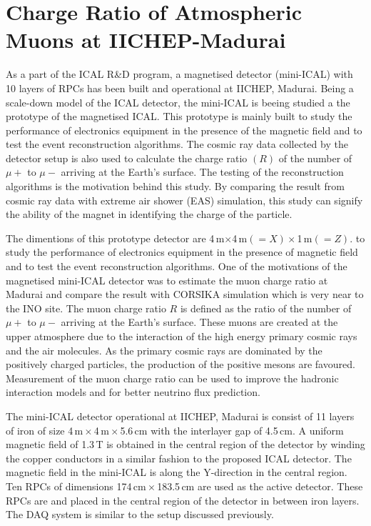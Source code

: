 
\chapter{Charge Ratio of Atmospheric Muons at IICHEP-Madurai}

As a part of the ICAL R\&D program, a magnetised detector (mini-ICAL)
with 10 layers of RPCs has been built and operational at IICHEP,
Madurai. Being a scale-down model of the ICAL detector, the mini-ICAL
is beeing studied a the prototype of the magnetised ICAL. This
prototype is mainly built to study the performance of electronics
equipment in the presence of the magnetic field and to test the event
reconstruction algorithms. The cosmic ray data collected by the
detector setup is also used to calculate the charge ratio $(R)$
of the number of $\mu+$ to $\mu-$ arriving at the Earth's surface.
The testing of the reconstruction algorithms is the motivation behind
this study. By comparing the result from cosmic ray data with extreme
air shower (EAS) simulation, this study can signify the ability of
the magnet in identifying the charge of the particle.


The dimentions of this
prototype detector are 4\,m$\times$4\,m$(=X)\times$1\,m$(=Z)$. to
study the performance of electronics equipment in the presence of
magnetic field and to test the event reconstruction algorithms. One of
the motivations of the magnetised mini-ICAL detector was to estimate
the muon charge ratio at Madurai and compare the result with CORSIKA
simulation which is very near to the INO site. The muon charge ratio
$R$ is defined as the ratio of the number of $\mu+$ to $\mu-$ arriving
at the Earth's surface. These muons are created at the upper
atmosphere due to the interaction of the high energy primary cosmic
rays and the air molecules. As the primary cosmic rays are dominated
by the positively charged particles, the production of the positive
mesons are favoured. Measurement of the muon charge ratio can be used
to improve the hadronic interaction models and for better neutrino
flux prediction.

The mini-ICAL detector operational at IICHEP, Madurai is consist of 11
layers of iron of size 4\,m\,$\times$\,4\,m\,$\times$\,5.6\,cm with
the interlayer gap of 4.5\,cm. A uniform magnetic field of 1.3\,T is
obtained in the central region of the detector by winding the copper
conductors in a similar fashion to the proposed ICAL detector. The
magnetic field in the mini-ICAL is along the Y-direction in the
central region. Ten RPCs of dimensions 174\,cm\,$\times$\,183.5\,cm
are used as the active detector. These RPCs are and placed in the
central region of the detector in between iron layers. The DAQ system
is similar to the setup discussed previously.


